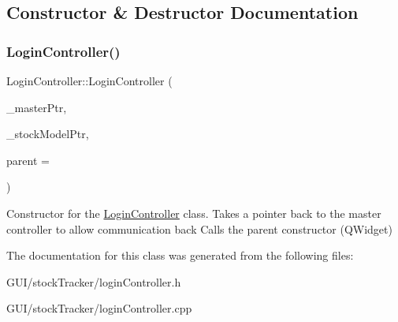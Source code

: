 \subsection{Constructor \& Destructor Documentation}
\mbox{\label{class_login_controller_a0deeca3547d53b2b4c668d89198f4d79}} 
\subsubsection{\texorpdfstring{Login\+Controller()}{LoginController()}}
{\footnotesize\ttfamily Login\+Controller\+::\+Login\+Controller (\begin{DoxyParamCaption}\item[{\mbox{\hyperlink{class_master_controller}{Master\+Controller}} $\ast$}]{\+\_\+master\+Ptr,  }\item[{\mbox{\hyperlink{class_stock_model}{Stock\+Model}} $\ast$}]{\+\_\+stock\+Model\+Ptr,  }\item[{Q\+Widget $\ast$}]{parent = {} }\end{DoxyParamCaption})}

Constructor for the \mbox{\hyperlink{class_login_controller}{Login\+Controller}} class. Takes a pointer back to the master controller to allow communication back Calls the parent constructor (Q\+Widget) 

The documentation for this class was generated from the following files\+:\begin{DoxyCompactItemize}
\item 
G\+U\+I/stock\+Tracker/login\+Controller.\+h\item 
G\+U\+I/stock\+Tracker/login\+Controller.\+cpp\end{DoxyCompactItemize}
